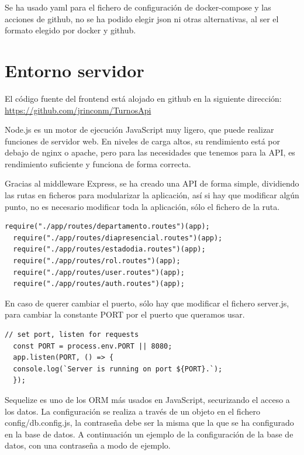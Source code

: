 \documentclass[11pt,spanish,listoffigures,listoftables]{tfgetsinf}
\begin{document}
Se ha usado yaml para el fichero de configuración de docker-compose y las acciones de github, no se ha podido elegir json ni otras alternativas, al ser el formato elegido por docker y github. 

\section{Entorno servidor}
El código fuente del frontend está alojado en github en la siguiente dirección: \url{https://github.com/jrinconm/TurnosApi}

Node.js es un motor de ejecución JavaScript muy ligero, que puede realizar funciones de servidor web. 
En niveles de carga altos, su rendimiento está por debajo de nginx o apache, pero para las necesidades que tenemos para la API, es rendimiento suficiente y funciona de forma correcta.

Gracias al middleware Express, se ha creado una API de forma simple, dividiendo las rutas en ficheros para modularizar la aplicación, así si hay que modificar algún punto, no es necesario modificar toda la aplicación, sólo el fichero de la ruta.

\begin{lstlisting}[style=ES6, caption={Importación rutas para Express}]
  require("./app/routes/departamento.routes")(app);
  require("./app/routes/diapresencial.routes")(app);
  require("./app/routes/estadodia.routes")(app);
  require("./app/routes/rol.routes")(app);
  require("./app/routes/user.routes")(app);
  require("./app/routes/auth.routes")(app);
\end{lstlisting}

  En caso de querer cambiar el puerto, sólo hay que modificar el fichero server.js, para cambiar la constante PORT por el puerto que queramos usar. 

\begin{lstlisting}[style=ES6, caption={Configuración del puerto de la API }]
  // set port, listen for requests
  const PORT = process.env.PORT || 8080;
  app.listen(PORT, () => {
  console.log(`Server is running on port ${PORT}.`);
  });
\end{lstlisting}

Sequelize es uno de los ORM más usados en JavaScript, securizando el acceso a los datos. 
La configuración se realiza a través de un objeto en el fichero config/db.config.js, la contraseña debe ser la misma que la que se ha configurado en la base de datos.
A continuación un ejemplo de la configuración de la base de datos, con una contraseña a modo de ejemplo.
\end{document}
